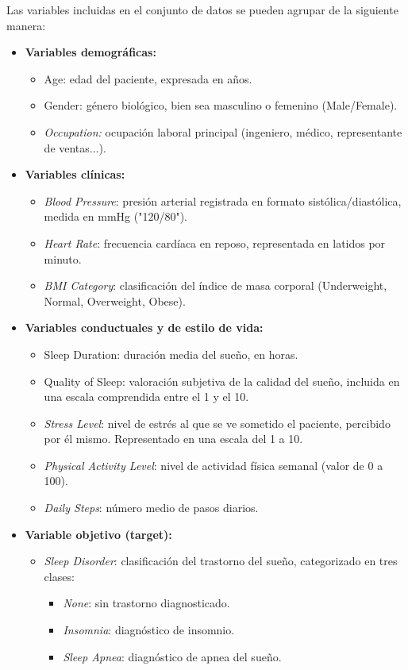 Las variables incluidas en el conjunto de datos se pueden agrupar de la siguiente manera:
\begin{itemize}
    \item \textbf{Variables demográficas:}
\begin{itemize}
    \item Age: edad del paciente, expresada en años.
    \item Gender: género biológico, bien sea masculino o femenino (Male/Female).
    \item \textit{Occupation:} ocupación laboral principal (ingeniero, médico, representante de ventas...).
\end{itemize}

\item  \textbf{Variables clínicas:}
\begin{itemize}
    \item \textit{Blood Pressure}: presión arterial registrada en formato sistólica/diastólica, medida en mmHg ("120/80").
    \item  \textit{Heart Rate}: frecuencia cardíaca en reposo, representada en latidos por minuto.
    \item  \textit{BMI Category}: clasificación del índice de masa corporal (Underweight, Normal, Overweight, Obese).
\end{itemize}

  \item \textbf{Variables conductuales y de estilo de vida:}
\begin{itemize}
    \item Sleep Duration: duración media del sueño, en horas.
\item Quality of Sleep: valoración subjetiva de la calidad del sueño, incluida en una escala comprendida entre el 1 y el 10.
\item \textit{Stress Level}: nivel de estrés al que se ve sometido el paciente, percibido por él mismo. Representado en una escala del 1 a 10.
\item \textit{Physical Activity Level}: nivel de actividad física semanal (valor de 0 a 100). 
\item \textit{Daily Steps}: número medio de pasos diarios.
\end{itemize}
\item \textbf{Variable objetivo (target):}
\begin{itemize}
    \item \textit{Sleep Disorder}: clasificación del trastorno del sueño, categorizado en tres clases:
    \begin{itemize}
        \item \textit{None}: sin trastorno diagnosticado.
        \item \textit{Insomnia}: diagnóstico de insomnio.
        \item \textit{Sleep Apnea}: diagnóstico de apnea del sueño.
    \end{itemize}
\end{itemize}
\end{itemize}

